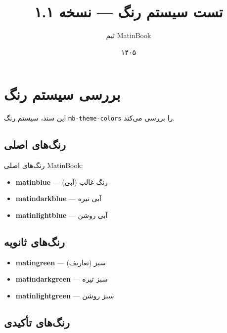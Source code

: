 \documentclass{matinbook}
\title{تست سیستم رنگ — نسخه ۱.۱}
\author{تیم MatinBook}
\date{۱۴۰۵}
\begin{document}
\maketitle

\chapter{بررسی سیستم رنگ}
\label{chap:test-colors}

این سند، سیستم رنگ \texttt{mb-theme-colors} را بررسی می‌کند.

\section{رنگ‌های اصلی}
\label{sec:primary-colors}

رنگ‌های اصلی MatinBook:

\begin{itemize}
    \item \textcolor{matinblue}{\textbf{matinblue}} — رنگ غالب (آبی)
    \item \textcolor{matindarkblue}{\textbf{matindarkblue}} — آبی تیره
    \item \textcolor{matinlightblue}{\textbf{matinlightblue}} — آبی روشن
\end{itemize}

\section{رنگ‌های ثانویه}
\label{sec:secondary-colors}

\begin{itemize}
    \item \textcolor{matingreen}{\textbf{matingreen}} — سبز (تعاریف)
    \item \textcolor{matindarkgreen}{\textbf{matindarkgreen}} — سبز تیره
    \item \textcolor{matinlightgreen}{\textbf{matinlightgreen}} — سبز روشن
\end{itemize}

\section{رنگ‌های تأکیدی}
\label{sec:accent-colors}
\end{document}
